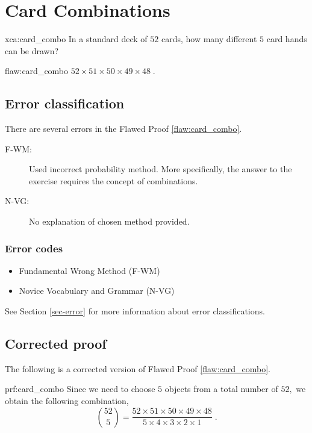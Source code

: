\section{Card Combinations}

\begin{xca}{xca:card_combo}
In a standard deck of $52$ cards, how many different $5$ card hands can be drawn?  
\end{xca}

\begin{flaw}{flaw:card_combo} %
$52 \times 51 \times 50 \times 49 \times 48\;.$
\end{flaw}

\clearpage
\subsection{Error classification}


There are several errors
 in the Flawed Proof \ref{flaw:card_combo}. %

 
 \begin{description}
 	\item[F-WM:] Used incorrect probability method. More specifically, the answer to the exercise requires the concept of combinations. 
 	\item[N-VG:] No explanation of chosen method provided. 
 \end{description}

 
\subsubsection{Error codes}
\begin{itemize}
	\item 	Fundamental Wrong Method (F-WM)
	\item   Novice Vocabulary and Grammar (N-VG)
\end{itemize}
See Section \ref{sec-error} for more information about error classifications.

\clearpage
\subsection{Corrected proof}

The following is a corrected version of Flawed Proof \ref{flaw:card_combo}. %

\begin{prf}{prf:card_combo} %
Since we need to choose $5$ objects from a total number of $52,$ we obtain the following combination,
$$\binom {52}{5}=\frac{52 \times 51 \times 50 \times 49 \times 48}{5 \times 4 \times 3 \times 2 \times 1}\;.$$
\end{prf}
